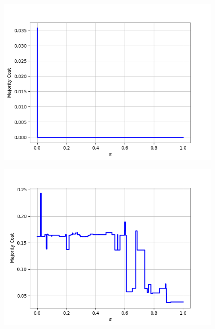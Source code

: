 \begin{figure}[h]
\begin{minipage}{.24\textwidth}
  {\includegraphics[width=\linewidth]{plots/nell-ac/politicsgroup}}
\end{minipage}
\begin{minipage}{.24\textwidth}
  \centering
  {\includegraphics[width=\linewidth]{plots/nell-ac/Product}}
\end{minipage}
\begin{minipage}{.24\textwidth}
  \centering

\end{minipage}
\end{figure}
